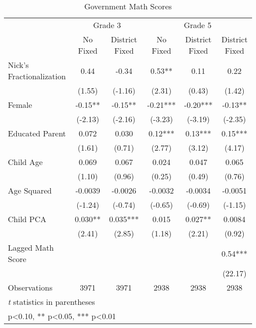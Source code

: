 \begin{table}[htbp]\centering
\def\sym#1{\ifmmode^{#1}\else\(^{#1}\)\fi}
\caption{Government Math Scores}
\begin{tabular}{l*{5}{c}}
\toprule
                &\multicolumn{2}{c}{Grade 3}&\multicolumn{3}{c}{Grade 5}           \\\cmidrule(lr){2-3}\cmidrule(lr){4-6}
                &\multicolumn{1}{c}{No Fixed}&\multicolumn{1}{c}{District Fixed}&\multicolumn{1}{c}{No Fixed}&\multicolumn{1}{c}{District Fixed}&\multicolumn{1}{c}{District Fixed}\\
\midrule
Nick's Fractionalization&     0.44   &    -0.34   &     0.53** &     0.11   &     0.22   \\
                &   (1.55)   &  (-1.16)   &   (2.31)   &   (0.43)   &   (1.42)   \\
Female          &    -0.15** &    -0.15** &    -0.21***&    -0.20***&    -0.13** \\
                &  (-2.13)   &  (-2.16)   &  (-3.23)   &  (-3.19)   &  (-2.35)   \\
Educated Parent &    0.072   &    0.030   &     0.12***&     0.13***&     0.15***\\
                &   (1.61)   &   (0.71)   &   (2.77)   &   (3.12)   &   (4.17)   \\
Child Age       &    0.069   &    0.067   &    0.024   &    0.047   &    0.065   \\
                &   (1.10)   &   (0.96)   &   (0.25)   &   (0.49)   &   (0.76)   \\
Age Squared     &  -0.0039   &  -0.0026   &  -0.0032   &  -0.0034   &  -0.0051   \\
                &  (-1.24)   &  (-0.74)   &  (-0.65)   &  (-0.69)   &  (-1.15)   \\
Child PCA       &    0.030** &    0.035***&    0.015   &    0.027** &   0.0084   \\
                &   (2.41)   &   (2.85)   &   (1.18)   &   (2.21)   &   (0.92)   \\
Lagged Math Score&            &            &            &            &     0.54***\\
                &            &            &            &            &  (22.17)   \\
\midrule
Observations    &     3971   &     3971   &     2938   &     2938   &     2938   \\
\bottomrule
\multicolumn{6}{l}{\footnotesize \textit{t} statistics in parentheses}\\
\multicolumn{6}{l}{\footnotesize * p<0.10, ** p<0.05, *** p<0.01}\\
\end{tabular}
\end{table}
